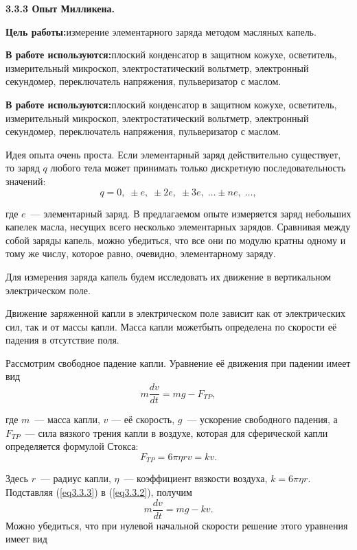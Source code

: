 {\large \bf 3.3.3 Опыт Милликена.}

{\bf Цель работы:}{измерение элементарного заряда методом масляных капель.}

{\bf В работе используются:}{плоский конденсатор в защитном кожухе, осветитель, измерительный микроскоп, электростатический вольтметр,
электронный секундомер, переключатель напряжения, пульверизатор с маслом.}

{\bf В работе используются:}{плоский конденсатор в защитном кожухе, осветитель, измерительный микроскоп, электростатический вольтметр,
электронный секундомер, переключатель напряжения, пульверизатор с маслом.}

Идея опыта очень проста. Если элементарный заряд действительно существует, то заряд $q$ любого тела может принимать
только дискретную последовательность значений:
\begin{equation}
q=0,\;\pm e,\;\pm 2e,\;\pm 3e,\;\ldots\pm ne,\;\ldots,
\label{eq3.3.1}
\end{equation}

где $e$~--- элементарный заряд. В предлагаемом опыте измеряется заряд небольших капелек масла, несущих всего несколько элементарных зарядов. Сравнивая между собой заряды капель, можно убедиться, что все они по модулю кратны одному и тому же числу, которое равно, очевидно, элементарному заряду.

Для измерения заряда капель будем исследовать их движение в вертикальном электрическом поле.

Движение заряженной капли в электрическом поле зависит как от электрических сил, так и от массы капли. Масса капли можетбыть определена по скорости её падения в отсутствие поля.

Рассмотрим свободное падение капли. Уравнение её движения при падении имеет вид
\begin{equation}
m\frac{dv}{dt}=mg-F_{TP},
\label{eq3.3.2}
\end{equation}

где $m$~--- масса капли, $v$ --- её скорость, $g$~--- ускорение свободного падения, а $F_{TP}$~--- сила вязкого трения капли в воздухе, которая для сферической капли определяется формулой Стокса:
\begin{equation}
F_{TP}=6\pi\eta rv=kv.
\label{eq3.3.3}
\end{equation}

Здесь $r$~--- радиус капли, $\eta$~--- коэффициент вязкости воздуха, $k=6\pi\eta r$. Подставляя (\ref{eq3.3.3}) в (\ref{eq3.3.2}), получим
\begin{equation}
m\frac{dv}{dt}=mg -kv.
\label{eq3.3.4}
\end{equation}
Можно убедиться, что при нулевой начальной скорости решение этого уравнения имеет вид

